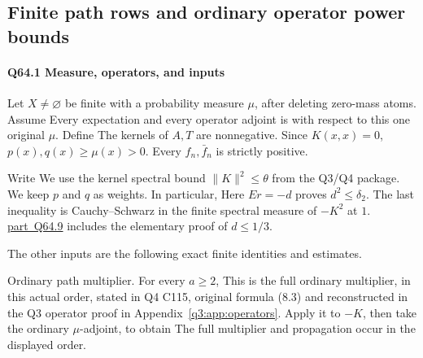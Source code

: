 \subsection{Finite path rows and ordinary operator power bounds}\label{proof:Q5-C064}
\paragraph{Q64.1 Measure, operators, and inputs}

Let \(X\ne\varnothing\) be finite with a probability measure \(\mu\),
after deleting zero-mass atoms. Assume
Every expectation and every operator adjoint is with respect to this
one original \(\mu\). Define
The kernels of \(A,\allowbreak  T\) are nonnegative. Since \(K(x,\allowbreak  x)=0\),
\(p(x),\allowbreak  q(x)\ge\mu(x)>0\). Every \(f_n,\allowbreak  \bar f_n\) is strictly positive.

Write
We use the kernel spectral bound
\(\|K\|^2\le\theta\) from the Q3/Q4 package. We keep \(p\) and \(q\) as weights. In particular,
Here \(Er=-d\) proves \(d^2\le \delta_2\). The last inequality is
Cauchy--Schwarz in the finite spectral measure of \(-K^2\) at \(1\).
\mbox{\hyperref[part:Q64.9]{part Q64.9}} includes the elementary proof of \(d\le1/3\).

The other inputs are the following exact finite identities and estimates.

Ordinary path multiplier. For every \(a\ge2\),
This is the full ordinary multiplier, in this actual order, stated in
Q4 C115, original formula (8.3) and reconstructed in the Q3 operator
proof in Appendix~\ref{q3:app:operators}. Apply it to \(-K\), then take the
ordinary \(\mu\)-adjoint, to obtain
The full multiplier and propagation occur in the displayed order.

